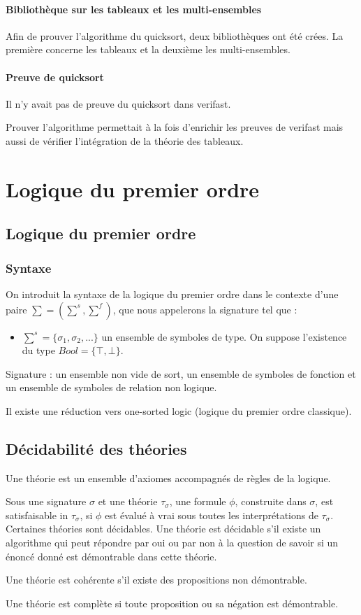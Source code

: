 \documentclass[9pt]{book}
\begin{document}
			\subsubsection{Biblioth\`eque sur les tableaux et les multi-ensembles}
			Afin de prouver l'algorithme du quicksort, deux biblioth\`eques ont \'et\'e cr\'ees. La premi\`ere concerne les tableaux et la deuxi\`eme les multi-ensembles.
			
			\subsubsection{Preuve de quicksort}
			Il n'y avait pas de preuve du quicksort dans verifast. \par Prouver l'algorithme permettait \`a la fois d'enrichir les preuves de verifast mais aussi de v\'erifier l'int\'egration de la th\'eorie des tableaux.
			
			
\chapter{Logique du premier ordre}
	\section{Logique du premier ordre}
		\subsection{Syntaxe}
		On introduit la syntaxe de la logique du premier ordre dans le contexte d'une paire $\sum = (\sum^s,\sum^f)$, que nous appelerons la signature tel que :
		\begin{itemize}
		\item $\sum^s = \{ \sigma_{1}, \sigma_{2},...\}$ un ensemble de symboles de type. On suppose l'existence du type $Bool = \{ \top , \bot \}$.
		\end{itemize}
		
	    Signature : un ensemble non vide de sort, un ensemble de symboles de fonction et un ensemble de symboles de relation non logique.\par
		Il existe une r\'eduction vers one-sorted logic (logique du premier ordre classique).
 	\section{D\'ecidabilit\'e des th\'eories}
 		Une th\'eorie est un ensemble d'axiomes accompagn\'es de r\`egles de la logique. \par
		Sous une signature $\sigma$ et une th\'eorie $\tau_{\sigma}$, une formule $\phi$, construite dans $\sigma$, est satisfaisable in $\tau_{\sigma}$, si $\phi$ est \'evalu\'e \`a vrai sous toutes les interpr\'etations de $\tau_{\sigma}$. 
 		Certaines th\'eories sont d\'ecidables. Une th\'eorie est d\'ecidable s'il existe un algorithme qui peut r\'epondre par oui ou par non \`a la question de savoir si un \'enonc\'e donn\'e est d\'emontrable dans cette th\'eorie. \par
 		Une th\'eorie est coh\'erente s'il existe des propositions non d\'emontrable. \par
 		Une th\'eorie est compl\`ete si toute proposition ou sa 
 		n\'egation est d\'emontrable.
\end{document}
